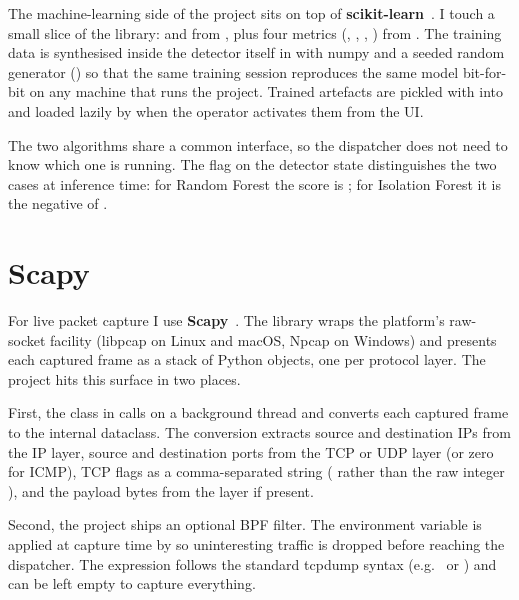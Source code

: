 The machine-learning side of the project sits on top of
\textbf{scikit-learn}~\cite{pedregosa2011scikit}. I touch a small
slice of the library:  and
 from , plus four
metrics (, ,
, ) from
. The training data is synthesised inside
the detector itself in
 with numpy and a
seeded random generator
() so that the same
training session reproduces the same model bit-for-bit on any
machine that runs the project. Trained artefacts are pickled
with  into
 and loaded lazily by
 when the operator activates them from the UI.

The two algorithms share a common  interface, so the dispatcher does not need to know
which one is running. The  flag on the detector
state distinguishes the two cases at inference time: for Random
Forest the score is ; for Isolation
Forest it is the negative of .

\section{Scapy}
\label{sec:tech-scapy}

For live packet capture I use \textbf{Scapy}~\cite{scapy}. The
library wraps the platform's raw-socket facility (libpcap on
Linux and macOS, Npcap on Windows) and presents each captured
frame as a stack of Python objects, one per protocol layer. The
project hits this surface in two places.

First, the  class in
 calls  on a
background thread and converts each captured frame to the internal
 dataclass. The conversion extracts source and
destination IPs from the IP layer, source and destination ports from
the TCP or UDP layer (or zero for ICMP), TCP flags as a
comma-separated string ( rather than the raw integer
), and the payload bytes from the  layer if
present.

Second, the project ships an optional BPF filter. The
 environment variable is applied at
capture time by  so uninteresting traffic is
dropped before reaching the dispatcher. The expression follows
the standard tcpdump syntax (e.g.\  or
) and can be left empty to capture
everything.

